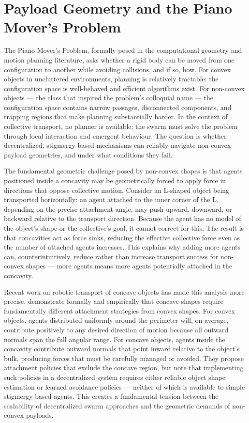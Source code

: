 \section{Payload Geometry and the Piano Mover's Problem}
\label{sec:geometry}

The Piano Mover's Problem, formally posed in the computational geometry and motion planning literature, asks whether a rigid body can be moved from one configuration to another while avoiding collisions, and if so, how. For convex objects in uncluttered environments, planning is relatively tractable: the configuration space is well-behaved and efficient algorithms exist. For non-convex objects — the class that inspired the problem's colloquial name — the configuration space contains narrow passages, disconnected components, and trapping regions that make planning substantially harder. In the context of collective transport, no planner is available; the swarm must solve the problem through local interaction and emergent behaviour. The question is whether decentralized, stigmergy-based mechanisms can reliably navigate non-convex payload geometries, and under what conditions they fail.

The fundamental geometric challenge posed by non-convex shapes is that agents positioned inside a concavity may be geometrically forced to apply force in directions that oppose collective motion. Consider an L-shaped object being transported horizontally: an agent attached to the inner corner of the L, depending on the precise attachment angle, may push upward, downward, or backward relative to the transport direction. Because the agent has no model of the object's shape or the collective's goal, it cannot correct for this. The result is that concavities act as force sinks, reducing the effective collective force even as the number of attached agents increases. This explains why adding more agents can, counterintuitively, reduce rather than increase transport success for non-convex shapes — more agents means more agents potentially attached in the concavity.

Recent work on robotic transport of concave objects has made this analysis more precise. \citet{nirgude2024} demonstrate formally and empirically that concave shapes require fundamentally different attachment strategies from convex shapes. For convex objects, agents distributed uniformly around the perimeter will, on average, contribute positively to any desired direction of motion because all outward normals span the full angular range. For concave objects, agents inside the concavity contribute outward normals that point inward relative to the object's bulk, producing forces that must be carefully managed or avoided. They propose attachment policies that exclude the concave region, but note that implementing such policies in a decentralized system requires either reliable object shape estimation or learned avoidance policies — neither of which is available to simple stigmergy-based agents. This creates a fundamental tension between the scalability of decentralized swarm approaches and the geometric demands of non-convex payloads.

